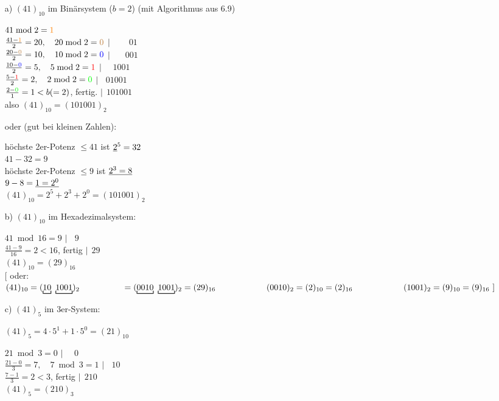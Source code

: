 \documentclass[a4paper, 12pt, twoside] {article}
\begin{document}
\begin{itemize}
\item[a)] $(41)_{10}$ im Binärsystem ($b=2$) (mit Algorithmus aus 6.9)

$41 \bmod 2 = \textcolor{orange}{1}$ \\
$\frac{41-\textcolor{orange}{1}}{2} = 20, \quad 20 \bmod 2 = \textcolor{brown}{0}$ \hfill $|\,\;\,\;\,\;\,\;\,\;01$ \\
$\frac{20-\textcolor{brown}{0}}{2}=10, \quad 10 \bmod 2 = \textcolor{blue}{0}$ \hfill $|\,\;\,\;\,\;\,\;001$ \\
$\frac{10-\textcolor{blue}{0}}{2}=5, \quad 5 \bmod 2 = \textcolor{red}{1}$ \hfill $|\,\;\,\;\,\;1001$ \\
$\frac{5-\textcolor{red}{1}}{2}=2, \quad 2 \bmod 2 = \textcolor{green}{0}$ \hfill $|\,\;\,\;01001$ \\
$\frac{2-\textcolor{green}{0}}{1}=1 < b (=2)$, fertig. \hfill $|\,\;101001$ \\
also $(41)_{10} = (101001)_2$

oder (gut bei kleinen Zahlen):

höchste 2er-Potenz $\leq 41$ ist $\uline{2}^5=32$ \\
$41-32 = 9$ \\
höchste 2er-Potenz $\leq 9$ ist $\uline{2^3=8}$ \\
$9-8 = \uline{1 = 2^0}$ \\
$(41)_{10} = 2^5+2^3+2^0 = (101001)_2$

\item[b)] $(41)_{10}$ im Hexadezimalsystem:

$41 \bmod 16 = 9$ \hfill $|\,\;\,\;9$ \\
$\frac{41-9}{16} = 2 < 16$, fertig \hfill $|\,\;29$ \\

$(41)_{10} = (29)_{16}$ \\
$[$ oder: $(41)_{10} = (\underbracket[0.75pt]{10}\ \underbracket[0.75pt]{1001})_2 \\
\text{\qquad \qquad \quad} = (\underbracket[0.75pt]{0010}\ \underbracket[0.75pt]{1001})_2 = (29)_{16}\ \\ \\
\text{\qquad \qquad \qquad} (0010)_2 = (2)_{10} = (2)_{16} \\
\text{\qquad \qquad \qquad} (1001)_2 = (9)_{10} = (9)_{16} \ ]$

\item[c)] $(41)_5$ im 3er-System: 

$(41)_5 = 4 \cdot 5^1 + 1 \cdot 5^0 = (21)_{10}$

$21 \bmod 3 = 0$ \hfill $|\,\;\,\;\,\;0$ \\
$\frac{21-0}{3}=7, \quad 7 \bmod 3 = 1$ \hfill $|\,\;\,\;10$ \\
$\frac{7-1}{3}=2 < 3$, fertig \hfill $|\,\;210$ \\
$(41)_5 = (210)_3$

\end{itemize}
\end{document}
